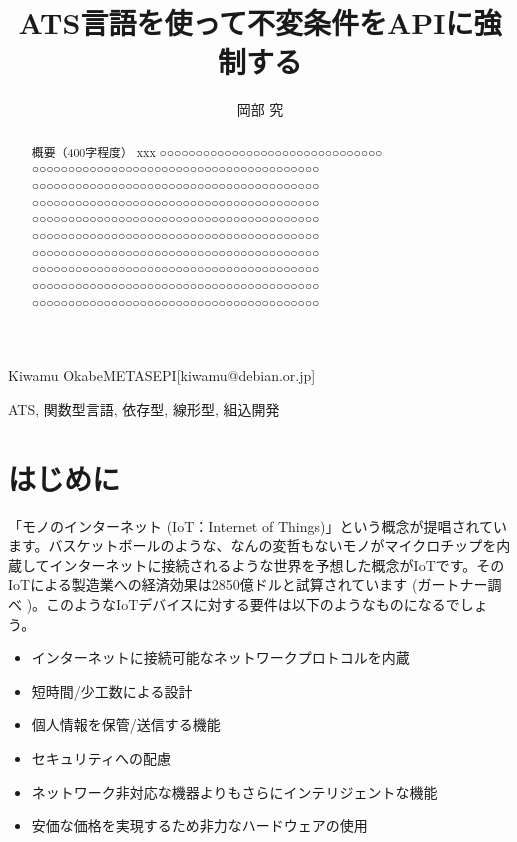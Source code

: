 \documentclass{ipsjprosym}
\begin{document}
\title{ATS言語を使って不変条件をAPIに強制する}


\author{岡部 究}{Kiwamu Okabe}{METASEPI}[kiwamu@debian.or.jp]

\begin{abstract}
概要（400字程度） xxx
○○○○○○○○○○○○○○○○○○○○○○○○○○○○○○○
○○○○○○○○○○○○○○○○○○○○○○○○○○○○○○○○○○○○○○○○
○○○○○○○○○○○○○○○○○○○○○○○○○○○○○○○○○○○○○○○○
○○○○○○○○○○○○○○○○○○○○○○○○○○○○○○○○○○○○○○○○
○○○○○○○○○○○○○○○○○○○○○○○○○○○○○○○○○○○○○○○○
○○○○○○○○○○○○○○○○○○○○○○○○○○○○○○○○○○○○○○○○
○○○○○○○○○○○○○○○○○○○○○○○○○○○○○○○○○○○○○○○○
○○○○○○○○○○○○○○○○○○○○○○○○○○○○○○○○○○○○○○○○
○○○○○○○○○○○○○○○○○○○○○○○○○○○○○○○○○○○○○○○○
○○○○○○○○○○○○○○○○○○○○○○○○○○○○○○○○○○○○○○○○
\end{abstract}

\begin{jkeyword}
ATS, 関数型言語, 依存型, 線形型, 組込開発
\end{jkeyword}

\maketitle

\section{はじめに}

「モノのインターネット (IoT：Internet of Things)」という概念が提唱されています。バスケットボールのような、なんの変哲もないモノがマイクロチップを内蔵してインターネットに接続されるような世界を予想した概念がIoTです。そのIoTによる製造業への経済効果は2850億ドルと試算されています (ガートナー調べ \cite{iot_monoist})。このようなIoTデバイスに対する要件は以下のようなものになるでしょう。

\begin{itemize}
\item インターネットに接続可能なネットワークプロトコルを内蔵
\item 短時間/少工数による設計
\item 個人情報を保管/送信する機能
\item セキュリティへの配慮
\item ネットワーク非対応な機器よりもさらにインテリジェントな機能
\item 安価な価格を実現するため非力なハードウェアの使用
\end{itemize}
\end{document}
